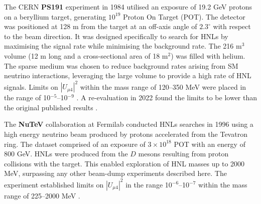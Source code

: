 \begin{coloritemize}
\item The CERN \textbf{PS191} experiment in 1984 utilised an exposure of 19.2 GeV protons on a beryllium target, generating $10^{19}$ Proton On Target (POT).
The detector was positioned at 128 m from the target at an off-axis angle of $2.3^{\circ}$ with respect to the beam direction.
It was designed specifically to search for HNLs by maximising the signal rate while minimising the background rate.
The 216 m$^{3}$ volume (12 m long and a cross-sectional area of 18 m$^{2}$) was filled with helium.
The sparse medium was chosen to reduce background rates arising from SM neutrino interactions, leveraging the large volume to provide a high rate of HNL signals. 
Limits on $|U_{\mu4}|^{2}$ within the mass range of 120--350 MeV were placed in the range of 10$^{-5}$--10$^{-9}$ \cite{PS191A, PS191B}.
A re-evaluation in 2022 found the limits to be lower than the original published results \cite{PS191C}.
	

\item The \textbf{NuTeV} collaboration at Fermilab conducted HNLs searches in 1996 using a high energy neutrino beam produced by protons accelerated from the Tevatron ring.
The dataset comprised of an exposure of $3 \times 10^{18}$ POT with an energy of 800 GeV.
HNLs were produced from the $D$ mesons resulting from proton collisions with the target.
This enabled exploration of HNL masses up to 2000 MeV, surpassing any other beam-dump experiments described here.
The experiment established limits on $|U_{\mu4}|^{2}$ in the range 10$^{-6}$--10$^{-7}$ within the mass range of 225--2000 MeV \cite{NuTeV}.


\end{coloritemize}

